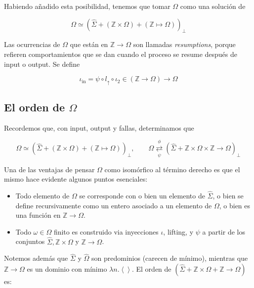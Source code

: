 \documentclass[a4paper, 12pt]{article}
\begin{document}
Habiendo añadido esta posibilidad, tenemos que tomar $\Omega$ como una solución
de 

\begin{equation*}
  \Omega \simeq \left( \hat{\Sigma} + \left( \mathbb{Z} \times \Omega \right) +
  \left( \mathbb{Z} \mapsto \Omega \right) \right)_\bot 
\end{equation*}

Las ocurrencias de $\Omega$ que están en $\mathbb{Z} \to \Omega$ son llamadas
\textit{resumptions}, porque refieren comportamientos que se dan cuando el
proceso se resume después de input o output. Se define 

\begin{equation*}
  \iota_{\text{in}} = \psi \circ l_{\uparrow} \circ \iota_2 \in \left(
  \mathbb{Z} \to \Omega \right) \to \Omega
\end{equation*}


\subsection{El orden de $\Omega$}

Recordemos que, con input, output y fallas, determinamos que

  
\begin{equation*}
  \Omega \simeq \left( \hat{\Sigma} + \left( \mathbb{Z} \times \Omega \right) +
  \left( \mathbb{Z} \mapsto \Omega \right) \right)_\bot, \qquad 
  \Omega 
\underset{\psi}{\overset{\phi}{\rightleftarrows}} 
\left( \hat{\Sigma} + \mathbb{Z} \times \Omega \times \mathbb{Z} \to \Omega \right)_{\perp}
\end{equation*}

Una de las ventajas de pensar $\Omega$ como isomórfico al término derecho es que
el mismo hace evidente algunos puntos esenciales:

\begin{itemize}
  \item Todo elemento de $\Omega$ se corresponde con o bien un elemento de $\hat{\Sigma}$, o bien
    se define recursivamente como un entero asociado a un elemento de $\Omega$, 
    o bien es una función en $\mathbb{Z} \to \Omega$. 
  \item Todo $\omega \in \Omega$ finito es construido via
    inyecciones $\iota$, lifting, y $\psi$ a partir de los conjuntos
    $\hat{\Sigma}, \mathbb{Z} \times \Omega$ y $\mathbb{Z} \to \Omega$.
\end{itemize}

Notemos además que $\hat{\Sigma}$ y $\hat{\Omega}$ son predominios (carecen de
mínimo), mientras que $\mathbb{Z} \to \Omega$ es un dominio con mínimo $\lambda
n . \left< \right>$. El orden de $(\hat{\Sigma} + \mathbb{Z} \times \Omega +
\mathbb{Z} \to \Omega)$ es:
\end{document}
